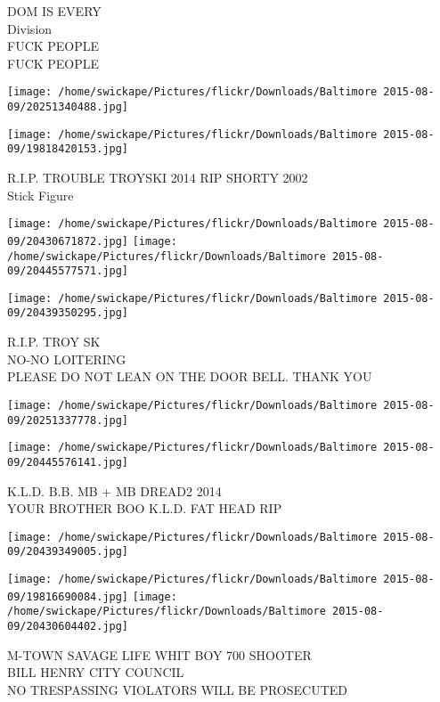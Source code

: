 \documentclass[10pt,letterpaper]{article}
\begin{document}
DOM IS EVERY\\
Division\\
FUCK PEOPLE\\
FUCK PEOPLE\\
\pagebreak

\texttt{[image: /home/swickape/Pictures/flickr/Downloads/Baltimore 2015-08-09/20251340488.jpg]}

\vspace{0.25in}
\texttt{[image: /home/swickape/Pictures/flickr/Downloads/Baltimore 2015-08-09/19818420153.jpg]}

R.I.P. TROUBLE TROYSKI 2014 RIP SHORTY 2002\\
Stick Figure\\
\pagebreak

\texttt{[image: /home/swickape/Pictures/flickr/Downloads/Baltimore 2015-08-09/20430671872.jpg]}
\texttt{[image: /home/swickape/Pictures/flickr/Downloads/Baltimore 2015-08-09/20445577571.jpg]}

\texttt{[image: /home/swickape/Pictures/flickr/Downloads/Baltimore 2015-08-09/20439350295.jpg]}

R.I.P. TROY SK\\
NO{-}NO LOITERING\\
PLEASE DO NOT LEAN ON THE DOOR BELL.  THANK YOU\\
\pagebreak

\texttt{[image: /home/swickape/Pictures/flickr/Downloads/Baltimore 2015-08-09/20251337778.jpg]}

\vspace{0.25in}
\texttt{[image: /home/swickape/Pictures/flickr/Downloads/Baltimore 2015-08-09/20445576141.jpg]}

K.L.D. B.B. MB + MB DREAD2 2014\\
YOUR BROTHER BOO K.L.D. FAT HEAD RIP\\
\pagebreak

\texttt{[image: /home/swickape/Pictures/flickr/Downloads/Baltimore 2015-08-09/20439349005.jpg]}

\vspace{0.25in}
\texttt{[image: /home/swickape/Pictures/flickr/Downloads/Baltimore 2015-08-09/19816690084.jpg]}
\texttt{[image: /home/swickape/Pictures/flickr/Downloads/Baltimore 2015-08-09/20430604402.jpg]}

M{-}TOWN SAVAGE LIFE WHIT BOY 700 SHOOTER\\
BILL HENRY CITY COUNCIL\\
NO TRESPASSING VIOLATORS WILL BE PROSECUTED\\
\pagebreak
\end{document}
